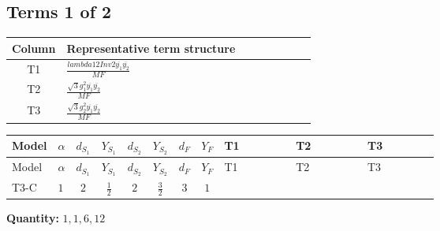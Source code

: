 \documentclass[8pt]{article}
\begin{document}
\begin{landscape}
\subsection*{Terms 1 of 2}
\begin{center}
\begin{tabular}{@{}c >{\raggedright\arraybackslash}p{0.82\linewidth}@{}}
\toprule
Column & Representative term structure \\
\midrule
T1 & \(\displaystyle \frac{lambda12Inv2 \overline{y_{1}} \overline{y_{2}}}{MF}\) \\
\midrule
T2 & \(\displaystyle \frac{\sqrt{3} g_{1}^{2} \overline{y_{1}} \overline{y_{2}}}{MF}\) \\
\midrule
T3 & \(\displaystyle \frac{\sqrt{3} g_{2}^{2} \overline{y_{1}} \overline{y_{2}}}{MF}\) \\
\midrule
\bottomrule
\end{tabular}
\end{center}
\smallskip
\tiny
\begin{longtable}{@{}llcccccc >{\raggedright\arraybackslash}p{0.21\linewidth} >{\raggedright\arraybackslash}p{0.21\linewidth} >{\raggedright\arraybackslash}p{0.21\linewidth}@{}}
\toprule
Model & $\alpha$ & $d_{S_1}$ & $Y_{S_1}$ & $d_{S_2}$ & $Y_{S_2}$ & $d_F$ & $Y_F$ & T1 & T2 & T3 \\
\midrule
\endfirsthead
\toprule
Model & $\alpha$ & $d_{S_1}$ & $Y_{S_1}$ & $d_{S_2}$ & $Y_{S_2}$ & $d_F$ & $Y_F$ & T1 & T2 & T3 \\
\midrule
\endhead
T3-C & $1$ & $2$ & $\frac{1}{2}$ & $2$ & $\frac{3}{2}$ & $3$ & $1$ & \scriptsize\adjustbox{max width=\linewidth}{$\begin{gathered} \frac{lambda12Inv2 \overline{y_{1}} \overline{y_{2}}}{3 MF}\end{gathered}$} & \scriptsize\adjustbox{max width=\linewidth}{$\begin{gathered} \frac{\sqrt{3} g_{1}^{2} \overline{y_{1}} \overline{y_{2}}}{2 MF}\end{gathered}$} & \scriptsize\adjustbox{max width=\linewidth}{$\begin{gathered} \frac{\sqrt{3} g_{2}^{2} \overline{y_{1}} \overline{y_{2}}}{4 MF}\end{gathered}$} \\
\midrule
\bottomrule
\end{longtable}
\clearpage
\noindent\textbf{Quantity: }$\mathrm{1,1,6,12}$\par\smallskip

\end{landscape}
\end{document}
